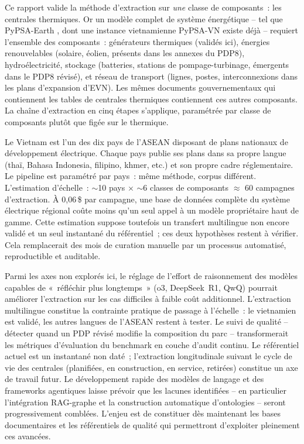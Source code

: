 \documentclass[a4paper,11pt]{report}
\begin{document}
Ce rapport valide la méthode d'extraction sur \emph{une} classe de composants~: les centrales thermiques. Or un modèle complet de système énergétique -- tel que PyPSA-Earth \citep{UMGUESAZ}, dont une instance vietnamienne PyPSA-VN existe déjà \citep{VGASHFPT} -- requiert l'ensemble des composants~: générateurs thermiques (validés ici), énergies renouvelables (solaire, éolien, présents dans les annexes du PDP8), hydroélectricité, stockage (batteries, stations de pompage-turbinage, émergents dans le PDP8 révisé), et réseau de transport (lignes, postes, interconnexions dans les plans d'expansion d'EVN). Les mêmes documents gouvernementaux qui contiennent les tables de centrales thermiques contiennent ces autres composants. La chaîne d'extraction en cinq étapes s'applique, paramétrée par classe de composants plutôt que figée sur le thermique.

Le Vietnam est l'un des dix pays de l'ASEAN disposant de plans nationaux de développement électrique. Chaque pays publie ses plans dans sa propre langue (thaï, Bahasa Indonesia, filipino, khmer, etc.) et son propre cadre réglementaire. Le pipeline est paramétré par pays~: même méthode, corpus différent. L'estimation d'échelle~: ${\sim}$10 pays $\times$ ${\sim}$6 classes de composants $\approx$ 60 campagnes d'extraction. À 0,06\,\$ par campagne, une base de données complète du système électrique régional coûte moins qu'un seul appel à un modèle propriétaire haut de gamme. Cette estimation suppose toutefois un transfert multilingue non encore validé et un seul instantané du référentiel~; ces deux hypothèses restent à vérifier. Cela remplacerait des mois de curation manuelle par un processus automatisé, reproductible et auditable.

Parmi les axes non explorés ici, le réglage de l'effort de raisonnement des modèles capables de «~réfléchir plus longtemps~» (o3, DeepSeek~R1, QwQ) pourrait améliorer l'extraction sur les cas difficiles à faible coût additionnel. L'extraction multilingue constitue la contrainte pratique de passage à l'échelle~: le vietnamien est validé, les autres langues de l'ASEAN restent à tester. Le suivi de qualité -- détecter quand un PDP révisé modifie la composition du parc -- transformerait les métriques d'évaluation du benchmark en couche d'audit continu. Le référentiel actuel est un instantané non daté~; l'extraction longitudinale suivant le cycle de vie des centrales (planifiées, en construction, en service, retirées) constitue un axe de travail futur. Le développement rapide des modèles de langage et des frameworks agentiques laisse prévoir que les lacunes identifiées -- en particulier l'intégration RAG-graphe et la construction automatique d'ontologies -- seront progressivement comblées. L'enjeu est de constituer dès maintenant les bases documentaires et les référentiels de qualité qui permettront d'exploiter pleinement ces avancées.
\end{document}
